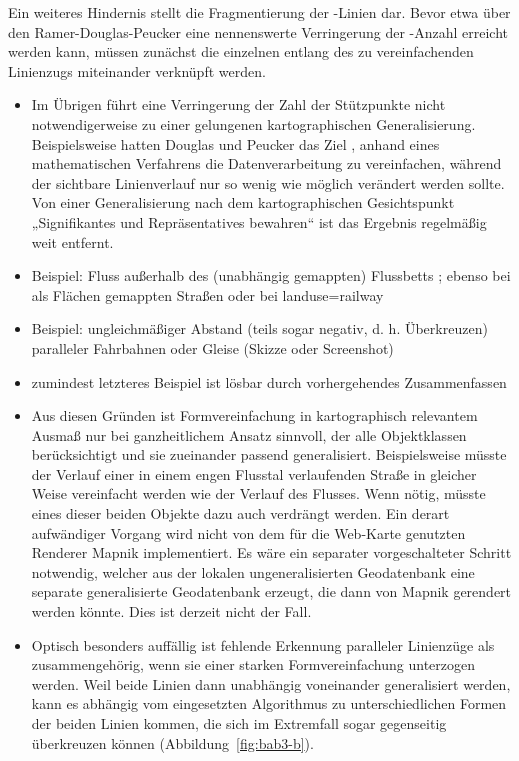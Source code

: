 \documentclass[../main/thesis.tex]{subfiles}
\begin{document}
Ein weiteres Hindernis stellt die Fragmentierung der \osm-Linien dar. Bevor etwa über den Ramer-Douglas-Peucker eine nennenswerte Verringerung der -Anzahl erreicht werden kann, müssen zunächst die einzelnen  entlang des zu vereinfachenden Linienzugs miteinander verknüpft werden.

\begin{itemize}
\item Im Übrigen führt eine Verringerung der Zahl der Stützpunkte nicht notwendigerweise zu einer gelungenen kartographischen Generalisierung. Beispielsweise hatten Douglas und Peucker das Ziel , anhand eines mathematischen Verfahrens die Datenverarbeitung zu vereinfachen, während der sichtbare Linienverlauf nur so wenig wie möglich verändert werden sollte. Von einer Generalisierung nach dem kartographischen Gesichtspunkt „Signifikantes und Repräsentatives bewahren“ ist das Ergebnis regelmäßig weit entfernt. \noref

\item Beispiel: Fluss außerhalb des (unabhängig gemappten) Flussbetts ; ebenso bei als Flächen gemappten Straßen oder bei landuse=railway
\item Beispiel: ungleichmäßiger Abstand (teils sogar negativ, d. h. Überkreuzen) paralleler Fahrbahnen oder Gleise (Skizze oder Screenshot)

\item zumindest letzteres Beispiel ist lösbar durch vorhergehendes Zusammenfassen

\item Aus diesen Gründen ist Formvereinfachung in kartographisch relevantem Ausmaß nur bei ganzheitlichem Ansatz sinnvoll, der alle Objektklassen berücksichtigt und sie zueinander passend generalisiert. Beispielsweise müsste der Verlauf einer in einem engen Flusstal verlaufenden Straße in gleicher Weise vereinfacht werden wie der Verlauf des Flusses. Wenn nötig, müsste eines dieser beiden Objekte dazu auch verdrängt werden.  Ein derart aufwändiger Vorgang wird nicht von dem für die Web-Karte genutzten Renderer Mapnik implementiert. Es wäre ein separater vorgeschalteter Schritt notwendig, welcher aus der lokalen ungeneralisierten Geodatenbank eine separate generalisierte Geodatenbank erzeugt, die dann von Mapnik gerendert werden könnte. Dies ist derzeit nicht der Fall.


\item Optisch besonders auffällig ist fehlende Erkennung paralleler Linienzüge als zusammengehörig, wenn sie einer starken Formvereinfachung unterzogen werden. Weil beide Linien dann unabhängig voneinander generalisiert werden, kann es abhängig vom eingesetzten Algorithmus zu unterschiedlichen Formen der beiden Linien kommen, die sich im Extremfall sogar gegenseitig überkreuzen können (Abbildung~\ref{fig:bab3-b}).

\end{itemize}
\end{document}
